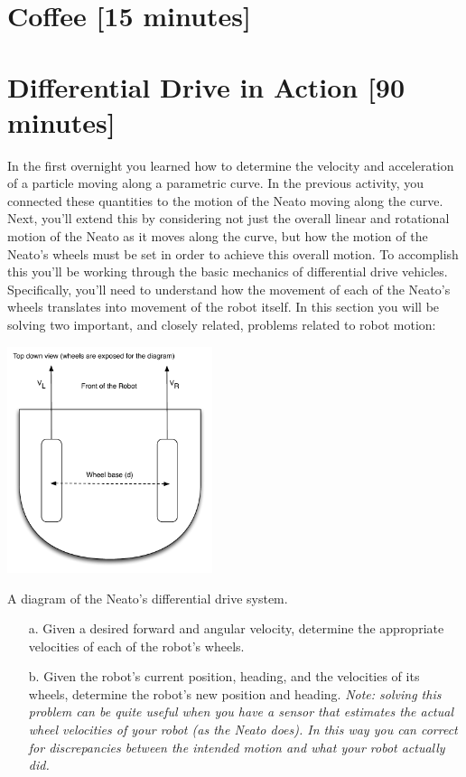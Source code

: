 \documentclass{tufte-handout}
\begin{document}
\ee

\section{Coffee [15 minutes]}

\section{Differential Drive in Action [90 minutes]}

In the first overnight you learned how to determine the velocity and acceleration of a particle moving along a parametric curve.  In the previous activity, you connected these quantities to the motion of the Neato moving along the curve.  Next, you'll extend this by considering not just the overall linear and rotational motion of the Neato as it moves along the curve, but how the motion of the Neato's wheels must be set in order to achieve this overall motion.  To accomplish this you'll be working through the basic mechanics of differential drive vehicles.  Specifically, you'll need to understand how the movement of each of the Neato's wheels translates into movement of the robot itself.  In this section you will be solving two important, and closely related, problems related to robot motion:
\begin{marginfigure}
\includegraphics[width=6cm]{figures/differential_drive}
\caption{A diagram of the Neato's differential drive system.\label{fig:differential_drive}}
\end{marginfigure}

\begin{itemize}
\item [a.] Given a desired forward and angular velocity, determine the appropriate velocities of each of the robot's wheels.
\item [b.] Given the robot's current position, heading, and the velocities of its wheels, determine the robot's new position and heading.  \emph{Note: solving this problem can be quite useful when you have a sensor that estimates the actual wheel velocities of your robot (as the Neato does).  In this way you can correct for discrepancies between the intended motion and what your robot actually did.}
\end{itemize}
\end{document}
